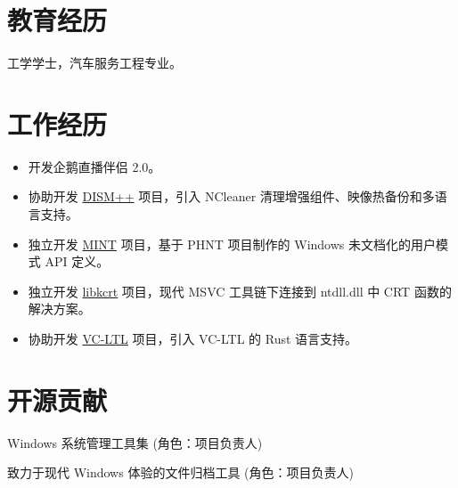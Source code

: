 \documentclass{resume}
\begin{document}
\renewcommand\headrulewidth{0pt}



\section{教育经历}

  工学学士，汽车服务工程专业。

\section{工作经历}

\begin{itemize}
  \item 开发企鹅直播伴侣 2.0。
\end{itemize}

\begin{itemize}
  \item 协助开发 \href{http://www.chuyu.me/zh-Hans/index.html}{DISM++} 项目，引入 NCleaner 清理增强组件、映像热备份和多语言支持。
  \item 独立开发 \href{https://github.com/Chuyu-Team/MINT}{MINT} 项目，基于 PHNT 项目制作的 Windows 未文档化的用户模式 API 定义。
  \item 独立开发 \href{https://github.com/Chuyu-Team/libkcrt}{libkcrt} 项目，现代 MSVC 工具链下连接到 ntdll.dll 中 CRT 函数的解决方案。
  \item 协助开发 \href{https://github.com/Chuyu-Team/VC-LTL5}{VC-LTL} 项目，引入 VC-LTL 的 Rust 语言支持。
\end{itemize}

\section{开源贡献}

Windows 系统管理工具集 (角色：项目负责人)

致力于现代 Windows 体验的文件归档工具 (角色：项目负责人)
\end{document}
